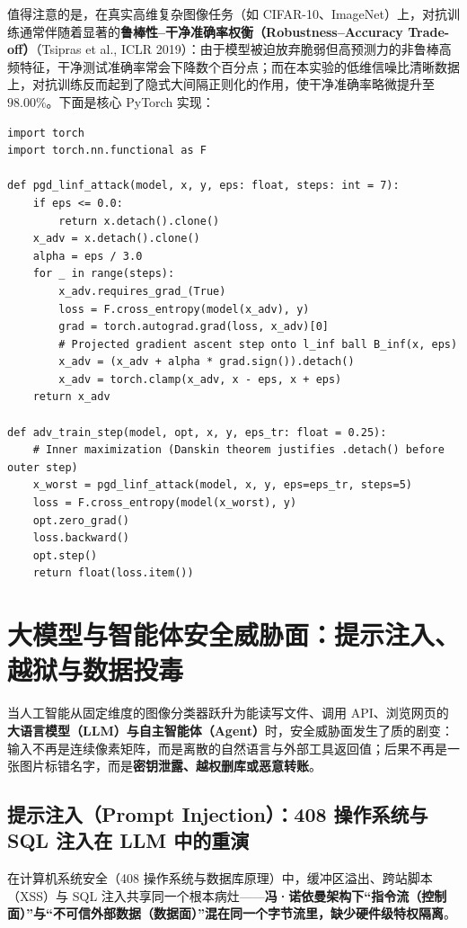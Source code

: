 值得注意的是，在真实高维复杂图像任务（如 CIFAR-10、ImageNet）上，对抗训练通常伴随着显著的\textbf{鲁棒性--干净准确率权衡（Robustness--Accuracy Trade-off）}（Tsipras et al., ICLR 2019）：由于模型被迫放弃脆弱但高预测力的非鲁棒高频特征，干净测试准确率常会下降数个百分点；而在本实验的低维信噪比清晰数据上，对抗训练反而起到了隐式大间隔正则化的作用，使干净准确率略微提升至 $98.00\%$。下面是核心 PyTorch 实现：

\begin{lstlisting}[caption={$\ell_\infty$ PGD 攻击与 Madry 极小极大对抗训练核心循环（PyTorch）}]
import torch
import torch.nn.functional as F

def pgd_linf_attack(model, x, y, eps: float, steps: int = 7):
    if eps <= 0.0:
        return x.detach().clone()
    x_adv = x.detach().clone()
    alpha = eps / 3.0
    for _ in range(steps):
        x_adv.requires_grad_(True)
        loss = F.cross_entropy(model(x_adv), y)
        grad = torch.autograd.grad(loss, x_adv)[0]
        # Projected gradient ascent step onto l_inf ball B_inf(x, eps)
        x_adv = (x_adv + alpha * grad.sign()).detach()
        x_adv = torch.clamp(x_adv, x - eps, x + eps)
    return x_adv

def adv_train_step(model, opt, x, y, eps_tr: float = 0.25):
    # Inner maximization (Danskin theorem justifies .detach() before outer step)
    x_worst = pgd_linf_attack(model, x, y, eps=eps_tr, steps=5)
    loss = F.cross_entropy(model(x_worst), y)
    opt.zero_grad()
    loss.backward()
    opt.step()
    return float(loss.item())
\end{lstlisting}

\section{大模型与智能体安全威胁面：提示注入、越狱与数据投毒}

当人工智能从固定维度的图像分类器跃升为能读写文件、调用 API、浏览网页的\textbf{大语言模型（LLM）与自主智能体（Agent）}时，安全威胁面发生了质的剧变：输入不再是连续像素矩阵，而是离散的自然语言与外部工具返回值；后果不再是一张图片标错名字，而是\textbf{密钥泄露、越权删库或恶意转账}。

\subsection{提示注入（Prompt Injection）：408 操作系统与 SQL 注入在 LLM 中的重演}

在计算机系统安全（408 操作系统与数据库原理）中，缓冲区溢出、跨站脚本（XSS）与 SQL 注入共享同一个根本病灶——\textbf{冯·诺依曼架构下“指令流（控制面）”与“不可信外部数据（数据面）”混在同一个字节流里，缺少硬件级特权隔离}。

